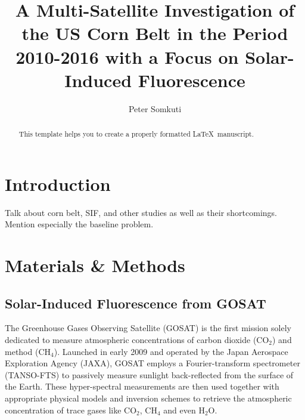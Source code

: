 \documentclass[preprint, a4paper, 10pt, times]{elsarticle}
\begin{document}
\begin{frontmatter}

\title{A Multi-Satellite Investigation of the US Corn Belt in the Period 2010-2016 with a Focus on Solar-Induced Fluorescence}

\author[uol,nceo]{Peter Somkuti}
\address[uol]{University of Leicester, Department of Physics of Astronomy, Leicester, UK}
\address[nceo]{National Centre for Earth Observation, University of Leicester, Leicester, UK}

\begin{abstract}
This template helps you to create a properly formatted \LaTeX\ manuscript.
\end{abstract}

\end{frontmatter}
\linenumbers

\section{Introduction}

Talk about corn belt, SIF, and other studies as well as their shortcomings. Mention especially the baseline problem.

\section{Materials \& Methods}
\subsection{Solar-Induced Fluorescence from GOSAT}

The Greenhouse Gases Observing Satellite (GOSAT) is the first mission solely dedicated to measure atmospheric concentrations of carbon dioxide (CO$_2$) and method (CH$_4$). Launched in early 2009 and operated by the Japan Aerospace Exploration Agency (JAXA), GOSAT employs a Fourier-transform spectrometer (TANSO-FTS) to passively measure sunlight back-reflected from the surface of the Earth. These hyper-spectral measurements are then used together with appropriate physical models and inversion schemes to retrieve the atmospheric concentration of trace gases like CO$_2$, CH$_4$ and even H$_2$O.
\end{document}
